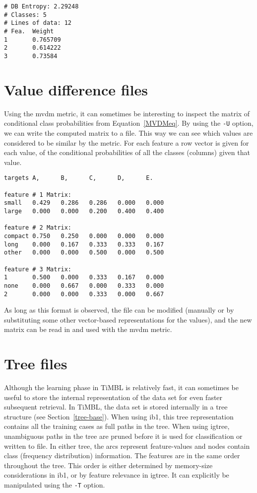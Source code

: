 \documentclass{report}
\begin{document}
\begin{verbatim}
# DB Entropy: 2.29248
# Classes: 5
# Lines of data: 12
# Fea.  Weight
1       0.765709
2       0.614222
3       0.73584
\end{verbatim}

\section{Value difference files}
\label{mvdmformat}

Using the {\sc mvdm} metric, it can sometimes be interesting to
inspect the matrix of conditional class probabilities from
Equation~\ref{MVDMeq}. By using the {\tt -U} option, we can write the
computed matrix to a file. This way we can see which values are
considered to be similar by the metric. For each feature a row vector
is given for each value, of the conditional probabilities of all the
classes (columns) given that value.

\begin{verbatim}
targets A,      B,      C,      D,      E.

feature # 1 Matrix: 
small   0.429   0.286   0.286   0.000   0.000
large   0.000   0.000   0.200   0.400   0.400
 
feature # 2 Matrix: 
compact 0.750   0.250   0.000   0.000   0.000
long    0.000   0.167   0.333   0.333   0.167
other   0.000   0.000   0.500   0.000   0.500
 
feature # 3 Matrix: 
1       0.500   0.000   0.333   0.167   0.000
none    0.000   0.667   0.000   0.333   0.000
2       0.000   0.000   0.333   0.000   0.667
\end{verbatim}

As long as this format is observed, the file can be modified (manually
or by substituting some other vector-based representations for the
values), and the new matrix can be read in and used with the {\sc
mvdm} metric.

\section{Tree files}
\label{treeformat}

Although the learning phase in TiMBL is relatively fast, it can
sometimes be useful to store the internal representation of the data
set for even faster subsequent retrieval. In TiMBL, the data set is
stored internally in a tree structure (see
Section~\ref{tree-base}). When using {\sc ib1}, this tree representation
contains all the training cases as full paths in the tree. When using
{\sc igtree}, unambiguous paths in the tree are pruned before it is
used for classification or written to file. In either tree, the arcs
represent feature-values and nodes contain class (frequency
distribution) information. The features are in the same order
throughout the tree. This order is either determined by memory-size
considerations in {\sc ib1}, or by feature relevance in {\sc igtree}. It can
explicitly be manipulated using the {\tt -T} option.
\end{document}
